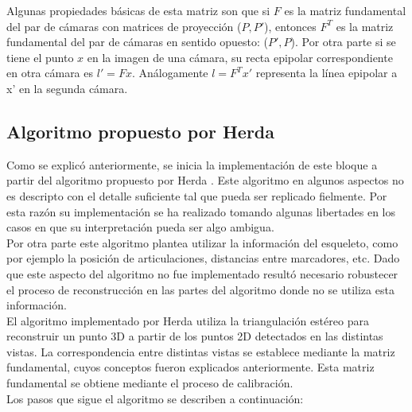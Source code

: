 Algunas propiedades básicas de esta matriz son que si $F$ es la matriz fundamental del par de cámaras con matrices de proyección ($P,P'$), entonces $F^T$ es la matriz fundamental del par de cámaras en sentido opuesto: ($P',P$). Por otra parte si se tiene el punto $x$ en la imagen de una cámara, su recta epipolar correspondiente en otra cámara es $l'=Fx$. Análogamente $l=F^Tx'$ representa la línea epipolar a x' en la segunda cámara.

\subsection{Algoritmo propuesto por Herda }

Como se explicó anteriormente, se inicia la implementación de este bloque a partir del algoritmo propuesto por Herda \cite{herda}. Este algoritmo en algunos aspectos no es descripto con el detalle suficiente tal que pueda ser replicado fielmente. Por esta razón su implementación se ha realizado tomando algunas libertades en los casos en que su interpretación pueda ser algo ambigua.\\

Por otra parte este algoritmo plantea utilizar la información del esqueleto, como por ejemplo la posición de articulaciones, distancias entre marcadores, etc. Dado que este aspecto del algoritmo no fue implementado resultó necesario robustecer el proceso de reconstrucción en las partes del algoritmo donde no se utiliza esta información.\\


El algoritmo implementado por Herda utiliza la triangulación estéreo para reconstruir un punto 3D a partir de los puntos 2D detectados en las distintas vistas. La correspondencia entre distintas vistas se establece mediante la matriz fundamental, cuyos conceptos fueron explicados anteriormente. Esta matriz fundamental se obtiene mediante el proceso de calibración.\\

Los pasos que sigue el algoritmo se describen a continuación:\


